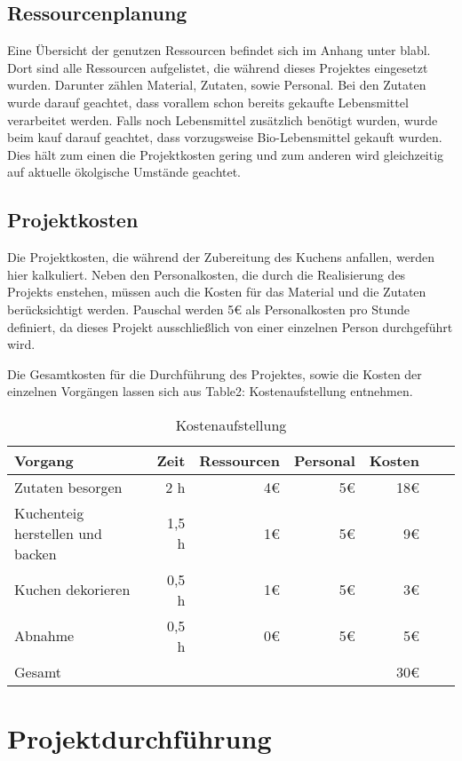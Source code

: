 \subsection{Ressourcenplanung}
Eine Übersicht der genutzen Ressourcen befindet sich im Anhang unter blabl. Dort
sind alle Ressourcen aufgelistet, die während dieses Projektes eingesetzt wurden. Darunter
zählen Material, Zutaten, sowie Personal. Bei den Zutaten wurde darauf geachtet, dass vorallem schon bereits gekaufte Lebensmittel verarbeitet werden.
Falls noch Lebensmittel zusätzlich benötigt wurden, wurde beim kauf darauf geachtet, dass vorzugsweise Bio-Lebensmittel gekauft wurden.
Dies hält zum einen die Projektkosten gering und zum anderen wird gleichzeitig auf aktuelle ökolgische Umstände geachtet.
\subsection{Projektkosten}
Die Projektkosten, die während der Zubereitung des Kuchens anfallen, werden hier kalkuliert.
Neben den Personalkosten, die durch die Realisierung des Projekts enstehen, müssen auch die Kosten für das Material und die Zutaten berücksichtigt werden.
Pauschal werden 5€ als Personalkosten pro Stunde definiert, da dieses Projekt ausschließlich von einer einzelnen Person durchgeführt wird.

Die Gesamtkosten für die Durchführung des Projektes, sowie die Kosten der einzelnen Vorgängen lassen sich aus Table2: Kostenaufstellung entnehmen.

\begin{table}[h]
    \centering
    \begin{tabular}{l*{5}{r}r|}
        \hline
        Vorgang    & Zeit  &    Ressourcen & Personal & Kosten\\
        \hline
        Zutaten besorgen & 2 h & 4€ & 5€ & 18€\\
        Kuchenteig herstellen und backen    & 1,5 h & 1€ & 5€  & 9€ \\
        Kuchen dekorieren      & 0,5 h & 1€ & 5€ & 3€   \\
        Abnahme & 0,5 h & 0€ & 5€ & 5€ \\
        \hline
        Gesamt & & & & 30€ \\
        \hline
        \end{tabular}
        \caption{Kostenaufstellung}
\end{table}
\section{Projektdurchführung}
